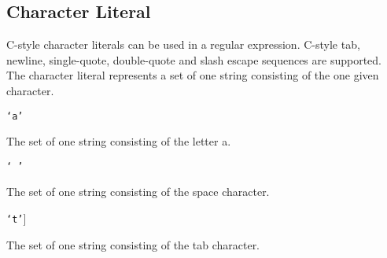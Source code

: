 
\subsection{Character Literal}
{
	C-style character literals can be used in a regular expression.
	C-style tab, newline, single-quote, double-quote and slash escape sequences
	are supported.
	The character literal represents a set of one string consisting of the one
	given character.
	
	\begin{itemize}
	{
		\item[] \texttt{`a'}
		
			The set of one string consisting of the letter a.
		
		\item[] \texttt{` '}
		
			The set of one string consisting of the space character.
		
		\item[] \texttt{`t'}]
		
			The set of one string consisting of the
			tab character.
	}
	\end{itemize}
}
